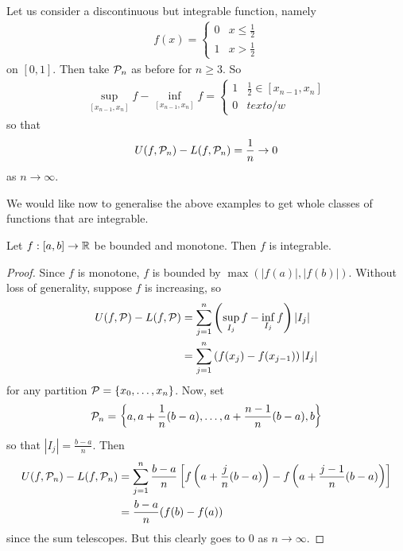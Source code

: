 \documentclass{../template/note}
\begin{document}
    \begin{example*}
        Let us consider a discontinuous but integrable function, namely
        \begin{align*}
            f(x) = \begin{cases}
                0 & x \leq \frac 1 2 \\
                1 & x > \frac 1 2
            \end{cases}
        \end{align*}
        on \([0, 1]\). Then take \(\mathcal{P}_n\) as before for \(n \geq 3\). So
        \begin{align*}
            \sup_{[x_{n-1},x_n]}f - \inf_{[x_{n-1},x_n]}f = \begin{cases}
                1 & \frac 1 2 \in [x_{n-1}, x_n] \\
                0 & text{o/w}
            \end{cases}
        \end{align*}
        so that
        \begin{align*}
            U(f, \mathcal{P}_n) - L(f, \mathcal{P}_n) = \frac 1 n \to 0
        \end{align*}
        as \(n \to \infty\).
    \end{example*}
    
    We would like now to generalise the above examples to get whole classes of functions that are integrable.

    \begin{proposition}
        Let \(f: [a, b] \to \mathbb R\) be bounded and monotone. Then \(f\) is integrable.
    \end{proposition}

    
    \begin{proof}
        Since \(f\) is monotone, \(f\) is bounded by \(\max\left(|f(a)|, |f(b)|\right)\). Without loss of generality, suppose \(f\) is increasing, so
        \begin{align*}
            U(f, \mathcal{P}) - L(f, \mathcal{P}) &= \sum_{j=1}^n \left(\sup_{I_j} f - \inf_{I_j} f\right)|I_j| \\
            &= \sum_{j=1}^n \left(f(x_j)-f(x_{j-1})\right)|I_j|
        \end{align*}
        for any partition \(\mathcal{P} = \{x_0, \dots, x_n\}\). Now, set
        \begin{align*}
            \mathcal{P}_n = \left\{a, a + \frac 1 n (b-a), \dots, a + \frac{n-1}{n}(b-a), b\right\}
        \end{align*}
        so that \(|I_j| = \frac{b-a}{n}\). Then
        \begin{align*}
            U(f, \mathcal{P}_n) - L(f, \mathcal{P}_n) &= \sum_{j=1}^n \frac{b-a}{n} \left[f\left(a + \frac j n (b-a)\right) - f\left(a + \frac{j-1} n (b-a)\right)\right] \\
            &= \frac{b-a}{n}(f(b)-f(a))
        \end{align*}
        since the sum telescopes. But this clearly goes to 0 as \(n \to \infty\).
    \end{proof}
\end{document}
